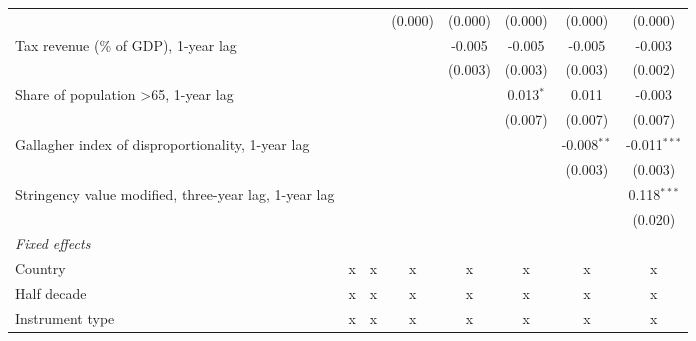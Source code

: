 \begin{tabular}{lccccccc}
                                                                    &                &                & (0.000)        & (0.000)        & (0.000)        & (0.000)        & (0.000)\\   
   Tax revenue (\% of GDP), 1-year lag                              &                &                &                & -0.005         & -0.005         & -0.005         & -0.003\\   
                                                                    &                &                &                & (0.003)        & (0.003)        & (0.003)        & (0.002)\\   
   Share of population >65, 1-year lag                              &                &                &                &                & 0.013$^{*}$    & 0.011          & -0.003\\   
                                                                    &                &                &                &                & (0.007)        & (0.007)        & (0.007)\\   
   Gallagher index of disproportionality, 1-year lag                &                &                &                &                &                & -0.008$^{**}$  & -0.011$^{***}$\\   
                                                                    &                &                &                &                &                & (0.003)        & (0.003)\\   
   Stringency value modified, three-year lag, 1-year lag            &                &                &                &                &                &                & 0.118$^{***}$\\   
                                                                    &                &                &                &                &                &                & (0.020)\\   
   \emph{Fixed effects}\\
   Country                                                          & x              & x              & x              & x              & x              & x              & x\\  
   Half decade                                                      & x              & x              & x              & x              & x              & x              & x\\  
   Instrument type                                                  & x              & x              & x              & x              & x              & x              & x\\  

\end{tabular}
